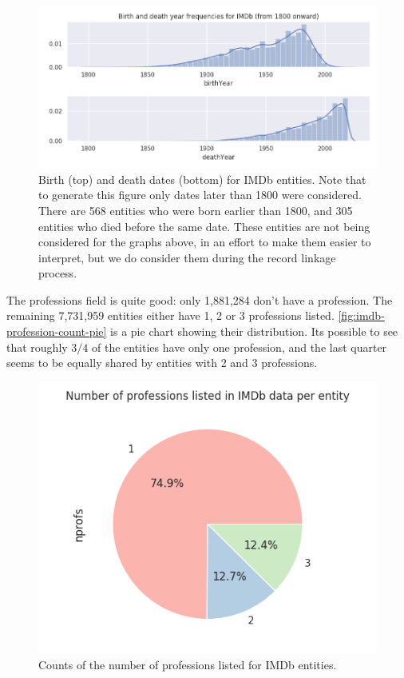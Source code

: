 \documentclass[epsfig,a4paper,11pt,titlepage,twoside,openany]{book}
\begin{document}
\begin{figure}[]
  \centering \includegraphics[width=.9\textwidth]{birth_and_death_frequencies_imdb}
  \caption{Birth (top) and death dates (bottom) for IMDb entities. Note that to generate this figure only dates later than 1800 were considered. There are 568 entities who were born earlier than 1800, and 305 entities who died before the same date. These entities are not being considered for the graphs above, in an effort to make them easier to interpret, but we do consider them during the record linkage process.}
  \label{fig:imdb-years-distplot}
\end{figure}

The professions field is quite good: only 1,881,284 don't have a profession. The remaining 7,731,959 entities either have 1, 2 or 3 professions listed. \autoref{fig:imdb-profession-count-pie} is a pie chart showing their distribution. Its possible to see that roughly $3/4$ of the entities have only one profession, and the last quarter seems to be equally shared by entities with 2 and 3 professions.

\begin{figure}[]
  \centering \includegraphics[width=.6\textwidth]{profession_counts_imdb}
  \caption{Counts of the number of professions listed for IMDb entities.}
  \label{fig:imdb-profession-count-pie}
\end{figure}
\end{document}
